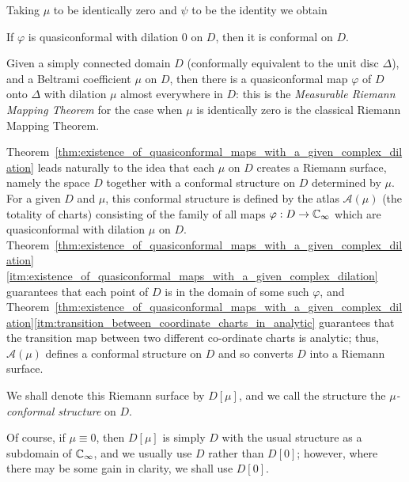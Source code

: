 Taking $\mu$ to be identically zero and $\psi$ to be the identity we obtain

\begin{corollary}
    If $\varphi$ is quasiconformal with dilation $0$ on $D$, then it is
    conformal on $D$.
\end{corollary}

\begin{remark}
    Given a simply connected domain $D$ (conformally equivalent to the unit disc
    $\Delta$), and a Beltrami coefficient $\mu$ on $D$, then there is a
    quasiconformal map $\varphi$ of $D$ onto $\Delta$ with dilation $\mu$ almost
    everywhere in $D$: this is the \emph{Measurable Riemann Mapping Theorem} for
    the case when $\mu$ is identically zero is the classical Riemann Mapping
    Theorem.
\end{remark}

Theorem~\ref{thm:existence_of_quasiconformal_maps_with_a_given_complex_dilation}
leads naturally to the idea that each $\mu$ on $D$ creates a Riemann surface,
namely the space $D$ together with a conformal structure on $D$ determined by
$\mu$. For a given $D$ and $\mu$, this conformal structure is defined by the
atlas $\mathcal{A}(\mu)$ (the totality of charts) consisting of the family of all
maps $\varphi: D \to \mathbb{C}_\infty$ which are quasiconformal with dilation $\mu$ on $D$.
Theorem~\ref{thm:existence_of_quasiconformal_maps_with_a_given_complex_dilation}\ref{itm:existence_of_quasiconformal_maps_with_a_given_complex_dilation}
guarantees that each point of $D$ is in the domain of some such $\varphi$, and
Theorem~\ref{thm:existence_of_quasiconformal_maps_with_a_given_complex_dilation}\ref{itm:transition_between_coordinate_charts_in_analytic}
guarantees that the transition map between two different co-ordinate charts is
analytic; thus, $\mathcal{A}(\mu)$ defines a conformal structure on $D$ and so
converts $D$ into a Riemann surface.

\begin{definition}
    We shall denote this Riemann surface by $D[\mu]$, and we call the structure
    the \emph{$\mu$-conformal structure} on $D$.
\end{definition}

Of course, if $\mu \equiv 0$, then $D[\mu]$ is simply $D$ with the usual
structure as a subdomain of $\mathbb{C}_\infty$, and we usually use $D$ rather than $D[0]$;
however, where there may be some gain in clarity, we shall use $D[0]$.

